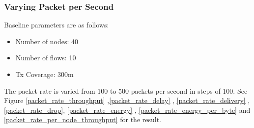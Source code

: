 \subsubsection{Varying Packet per Second}
Baseline parameters are as follows:
\begin{itemize}
    \item Number of nodes: 40
    \item Number of flows: 10
    \item Tx Coverage: 300m
\end{itemize}
The packet rate is varied from 100 to 500 packets per second in steps of 100.
See Figure \ref{packet_rate_throughput} ,\ref{packet_rate_delay} , \ref{packet_rate_delivery} , \ref{packet_rate_drop}, \ref{packet_rate_energy} , \ref{packet_rate_energy_per_byte} and \ref{packet_rate_per_node_throughput} for the result.

